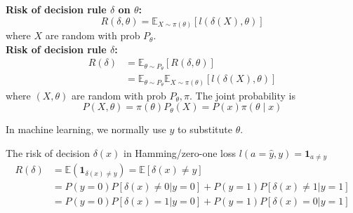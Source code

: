 \documentclass[11pt]{elegantbook}
\begin{document}
\begin{definition}[Risk]
    \normalfont
    \textbf{Risk of decision rule $\delta$ on $\theta$:} $$R(\delta,\theta)=\mathbb{E}_{X\sim \pi(\theta)}\left[l(\delta(X),\theta)\right]$$ where $X$ are random with prob $P_\theta$.\\
    \textbf{Risk of decision rule $\delta$:}
        \begin{equation}
            \begin{aligned}
                R(\delta)&=\mathbb{E}_{\theta\sim P_\theta}[R(\delta,\theta)]\\
                &=\mathbb{E}_{\theta\sim P_\theta}\mathbb{E}_{X\sim \pi(\theta)}\left[l(\delta(X),\theta)\right]
            \end{aligned}
            \nonumber
        \end{equation}
        where $(X,\theta)$ are random with prob $P_\theta, \pi$. The joint probability is $$P(X,\theta)=\pi(\theta)P_\theta(X)=P(x)\pi(\theta\mid x)$$
\end{definition}
\begin{note}
    In machine learning, we normally use $y$ to substitute $\theta$.
\end{note}


\begin{example}
    The risk of decision $\delta(x)$ in Hamming/zero-one loss $l(a=\hat{y},y)=\mathbf{1}_{a\neq y}$
    \begin{equation}
        \begin{aligned}
            R(\delta)&=\mathbb{E}(\mathbf{1}_{\delta(x)\neq y})=\mathbb{E}[\delta(x)\neq y]\\
            &=P(y=0)P[\delta(x)\neq 0|y=0]+P(y=1)P[\delta(x)\neq 1|y=1]\\
            &=P(y=0)P[\delta(x)=1|y=0]+P(y=1)P[\delta(x)=0|y=1]
        \end{aligned}
        \nonumber
    \end{equation}
\end{example}
\end{document}
